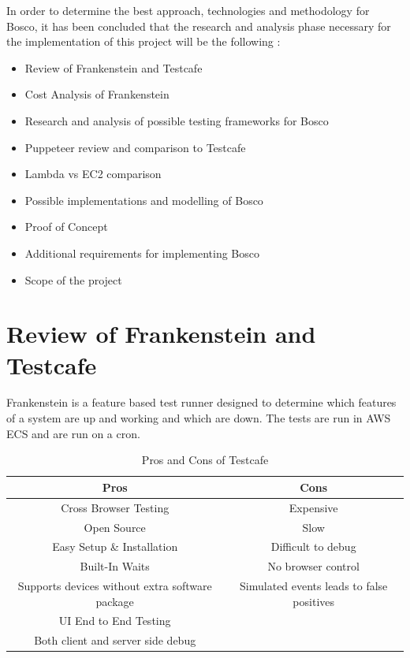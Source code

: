 \documentclass[12pt,a4paper,titlepage]{report}
\begin{document}
In order to determine the best approach, technologies and methodology for Bosco, it has been concluded that the research and analysis phase necessary for the implementation of this project will be the following :

\begin{itemize}
  \item Review of Frankenstein and Testcafe
  \item Cost Analysis of Frankenstein
  \item Research and analysis of possible testing frameworks for Bosco
  \item Puppeteer review and comparison to Testcafe
  \item Lambda vs EC2 comparison
  \item Possible implementations and modelling of Bosco
  \item Proof of Concept
  \item Additional requirements for implementing Bosco
  \item Scope of the project
\end{itemize}

\section{Review of Frankenstein and Testcafe}
Frankenstein is a feature based test runner designed to determine
which features of a system are up and working and which are down.
The tests are run in AWS ECS and are run on a cron.

\begin{table}[H]
  \centering
  \small
  \setlength\tabcolsep{6pt}
  \begin{tabular}{|c|c|}
    \hline \textbf
    {Pros}& \textbf {Cons}\\
    \hline\hline
    Cross Browser Testing& Expensive\\
    \hline
    Open Source& Slow\\
    \hline
    Easy Setup \& Installation                      & Difficult to debug\\
    \hline
    Built-In Waits& No browser control\\
    \hline
    Supports devices without extra software package & Simulated events leads to false positives\\
    \hline
    UI End to End Testing \\
    \hline
    Both client and server side debug \\
    \hline
  \end{tabular}
  \caption{Pros and Cons of Testcafe}
  \label{table:testcafe:proscons}
\end{table}
\end{document}
